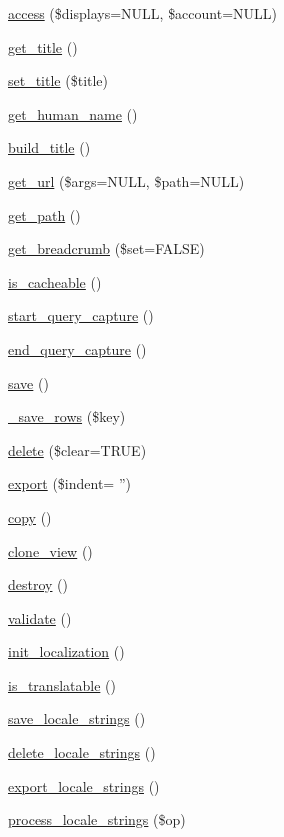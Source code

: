 \begin{DoxyCompactItemize}
\item 
\hyperlink{classview_a996e7b183eb9d43ec9d535dbf897616a}{access} (\$displays=NULL, \$account=NULL)
\item 
\hyperlink{classview_ad2fe858c2ebd577922413355cd42eb10}{get\_\-title} ()
\item 
\hyperlink{classview_aa849a1cc4b59a1cbd89ecd300d114d6d}{set\_\-title} (\$title)
\item 
\hyperlink{classview_aaa81acca86f138d34887f142910ad0e4}{get\_\-human\_\-name} ()
\item 
\hyperlink{classview_a15a2dddb480ab44af4a093579a544501}{build\_\-title} ()
\item 
\hyperlink{classview_a3ed974c9fffd899f1ad371c47e8781e3}{get\_\-url} (\$args=NULL, \$path=NULL)
\item 
\hyperlink{classview_a2a43eaa103f3bb4c6677afbf8a94a549}{get\_\-path} ()
\item 
\hyperlink{classview_ac8087bdc827dcf6f79630158f9941260}{get\_\-breadcrumb} (\$set=FALSE)
\item 
\hyperlink{classview_aca962e114d7d15eb16dd3b3616e5a96d}{is\_\-cacheable} ()
\item 
\hyperlink{classview_a1e3efc171324e713e7e130c445dbf84d}{start\_\-query\_\-capture} ()
\item 
\hyperlink{classview_a7170a33aff32de00b1ff92ee4483cb88}{end\_\-query\_\-capture} ()
\item 
\hyperlink{classview_a001430d43fd397235f63ad29fd269d53}{save} ()
\item 
\hyperlink{classview_ac54578fd717de9be8c127add6e869bc2}{\_\-save\_\-rows} (\$key)
\item 
\hyperlink{classview_aded9b6fb90cc3107254f6a98f910649f}{delete} (\$clear=TRUE)
\item 
\hyperlink{classview_a74dee74c2fbad9c0dc3450414d80216e}{export} (\$indent= '')
\item 
\hyperlink{classview_abc650102ccd583bd362f0e32fe091b99}{copy} ()
\item 
\hyperlink{classview_ad9f19580a578b9e05c7f353090668a99}{clone\_\-view} ()
\item 
\hyperlink{classview_acbe0d04120a4fe96759d84f5287e154d}{destroy} ()
\item 
\hyperlink{classview_a89950e757cb2da5094b1d413991fc353}{validate} ()
\item 
\hyperlink{classview_a6104b2107fa343423a9f2a6d678c394e}{init\_\-localization} ()
\item 
\hyperlink{classview_aafe1c7a6b96d17ffebaa88bace1a3d2d}{is\_\-translatable} ()
\item 
\hyperlink{classview_a72b8eadd6ae4a5c5d523dd87c258b470}{save\_\-locale\_\-strings} ()
\item 
\hyperlink{classview_aecbca30cd57e551d5a13b8e1caf75a86}{delete\_\-locale\_\-strings} ()
\item 
\hyperlink{classview_aa2e9f044446b2bd780abee1080640392}{export\_\-locale\_\-strings} ()
\item 
\hyperlink{classview_ab0ffcc535f57804df9a47585b30b3207}{process\_\-locale\_\-strings} (\$op)
\end{DoxyCompactItemize}
